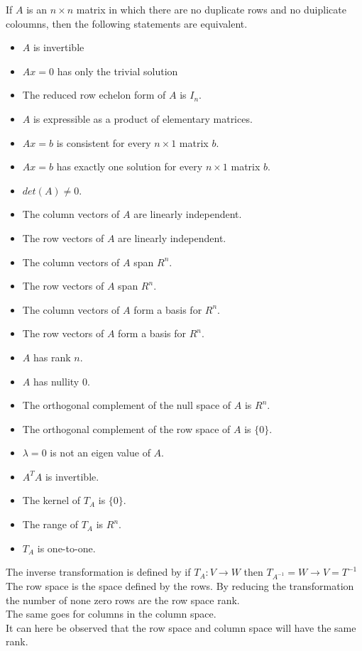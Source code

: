\documentclass[12pt, a4paper]{article}
\begin{document}
		If $A$ is an $n\times n$ matrix in which there are no duplicate rows and no duiplicate coloumns, then the following statements are equivalent.\\
		\begin{itemize}
			\item $A$ is invertible
			\item $Ax=0$ has only the trivial solution
			\item The reduced row echelon form of $A$ is $I_n$.
			\item $A$ is expressible as a product of elementary matrices.
			\item $Ax=b$ is consistent for every $n\times 1$ matrix $b$.
			\item $Ax=b$ has exactly one solution for every $n\times 1$ matrix $b$.
			\item $det(A)\neq 0$.
			\item The column vectors of $A$ are linearly independent.
			\item The row vectors of $A$ are linearly independent.
			\item The column vectors of $A$ span $R^n$.
			\item The row vectors of $A$ span $R^n$.
			\item The column vectors of $A$ form a basis for $R^n$.
			\item The row vectors of $A$ form a basis for $R^n$.
			\item $A$ has rank $n$.
			\item $A$ has nullity 0.
			\item The orthogonal complement of the null space of $A$ is $R^n$.
			\item The orthogonal complement of the row space of $A$ is $\{0\}$.
			\item $\lambda=0$ is not an eigen value of $A$.
			\item $A^TA$ is invertible.
			\item The kernel of $T_A$ is $\{0\}$.
			\item The range of $T_A$ is $R^n$.
			\item $T_A$ is one-to-one.
		\end{itemize}
		The inverse transformation is defined by if $T_A:V\rightarrow W$ then $T_{A^{-1}}=W\rightarrow V=T^{-1}$\\
		The row space is the space defined by the rows. By reducing the transformation the number of none zero rows are the row space rank.\\
		The same goes for columns in the column space.\\
		It can here be observed that the row space and column space will have the same rank.
\end{document}

